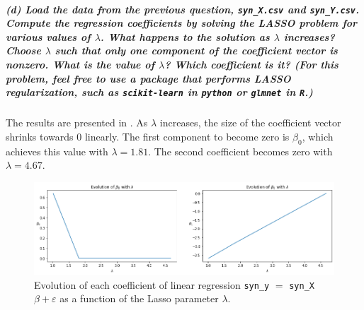 \documentclass[11pt, english]{article}
\begin{document}
    \hypertarget{d-load-the-data-from-the-previous-question-syn_x.csv-and-syn_y.csv.-compute-the-regression-coefficients-by-solving-the-lasso-problem-for-various-values-of-lambda.-what-happens-to-the-solution-as-lambda-increases-choose-lambda-such-that-only-one-component-of-the-coefficient-vector-is-nonzero.-what-is-the-value-of-lambda-which-coefficient-is-it-for-this-problem-feel-free-to-use-a-package-that-performs-lasso-regularization-such-as-scikit-learn-in-python-or-glmnet-in-r.}{%
\subparagraph{\texorpdfstring{(d) Load the data from the previous
question, \texttt{syn\_X.csv} and \texttt{syn\_Y.csv}. Compute the
regression coefficients by solving the LASSO problem for various values
of \(\lambda\). What happens to the solution as \(\lambda\) increases?
Choose \(\lambda\) such that only one component of the coefficient
vector is nonzero. What is the value of \(\lambda\)? Which coefficient
is it? (For this problem, feel free to use a package that performs LASSO
regularization, such as \texttt{scikit-learn} in \texttt{python} or
\texttt{glmnet} in
\texttt{R}.)\\[2ex]}{(d) Load the data from the previous question, syn\_X.csv and syn\_Y.csv. Compute the regression coefficients by solving the LASSO problem for various values of \textbackslash lambda. What happens to the solution as \textbackslash lambda increases? Choose \textbackslash lambda such that only one component of the coefficient vector is nonzero. What is the value of \textbackslash lambda? Which coefficient is it? (For this problem, feel free to use a package that performs LASSO regularization, such as scikit-learn in python or glmnet in R.)}}\label{d-load-the-data-from-the-previous-question-syn_x.csv-and-syn_y.csv.-compute-the-regression-coefficients-by-solving-the-lasso-problem-for-various-values-of-lambda.-what-happens-to-the-solution-as-lambda-increases-choose-lambda-such-that-only-one-component-of-the-coefficient-vector-is-nonzero.-what-is-the-value-of-lambda-which-coefficient-is-it-for-this-problem-feel-free-to-use-a-package-that-performs-lasso-regularization-such-as-scikit-learn-in-python-or-glmnet-in-r.}}

    The results are presented in . As \(\lambda\) increases, the size of the coefficient vector shrinks
towards 0 linearly. The first component to become zero is \(\beta_0\),
which achieves this value with \(\lambda = 1.81\). The second
coefficient becomes zero with \(\lambda = 4.67\).

\begin{figure}[H]
	\centering
	\includegraphics[width=\textwidth]{evolutionLasso}
	\caption{Evolution of each coefficient of linear regression \texttt{syn\_y} $=$ \texttt{syn\_X}$\beta + \varepsilon$ as a function of the Lasso parameter $\lambda$.}
\end{figure}
\end{document}
